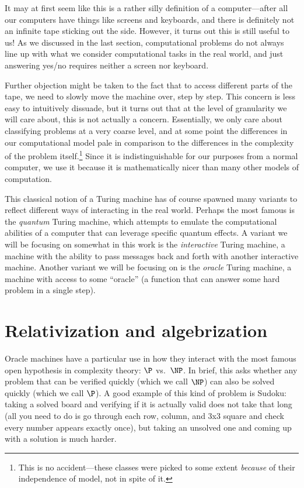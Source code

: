 \documentclass[english,12pt]{reedthesis}
\theoremstyle{plain}
\theoremstyle{definition}
\theoremstyle{remark}
\begin{document}
It may at first seem like this is a rather silly definition of a computer---after
all our computers have things like screens and keyboards, and there is
definitely not an infinite tape sticking out the side. However, it turns out
this is still useful to us! As we discussed in the last section, computational
problems do not always line up with what we consider computational tasks in the
real world, and just answering yes/no requires neither a screen nor keyboard.

Further objection might be taken to the fact that to access different parts of
the tape, we need to slowly move the machine over, step by step. This concern is
less easy to intuitively dissuade, but it turns out that at the level of
granularity we will care about, this is not actually a concern. Essentially, we
only care about classifying problems at a very coarse level, and at some point
the differences in our computational model pale in comparison to the differences
in the complexity of the problem itself.\footnote{This is no accident---these
  classes were picked to some extent \emph{because} of their independence of
  model, not in spite of it.} Since it is indistinguishable for our purposes
from a normal computer, we use it because it is mathematically nicer than many
other models of computation.

This classical notion of a Turing machine has of course spawned many variants to
reflect different ways of interacting in the real world. Perhaps the most famous
is the \emph{quantum} Turing machine, which attempts to emulate the
computational abilities of a computer that can leverage specific quantum
effects. A variant we will be focusing on somewhat in this work is the
\emph{interactive} Turing machine, a machine with the ability to pass messages
back and forth with another interactive machine. Another variant we will be
focusing on is the \emph{oracle} Turing machine, a machine with access to some
``oracle'' (a function that can answer some hard problem in a single step).

\section{Relativization and algebrization}

Oracle machines have a particular use in how they interact with the most famous
open hypothesis in complexity theory: $\P$ vs.\ $\NP$. In brief, this asks
whether any problem that can be verified quickly (which we call $\NP$) can also
be solved quickly (which we call $\P$). A good example of this kind of problem
is Sudoku: taking a solved board and verifying if it is actually valid does not
take that long (all you need to do is go through each row, column, and 3x3
square and check every number appears exactly once), but taking an unsolved one
and coming up with a solution is much harder.
\end{document}
